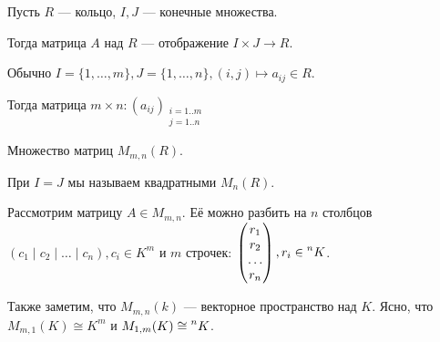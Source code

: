 \begin{definition}
    Пусть $R$ --- кольцо,  $I, J$ --- конечные множества.

    Тогда матрица $A$ над  $R$ --- отображение  $I \times J \to R$.

    Обычно  $I = \{1,\ldots, m\}, J = \{1, \ldots, n\}, (i, j) \mapsto a_{ij} \in R$.

    Тогда матрица $m \times n\!: (a_{ij})_{\substack{i=1..m \\ j = 1..n}}$
\end{definition}
\begin{definition}
    Множество матриц $M_{m, n}(R)$.

    При $I = J$ мы называем квадратными  $M_n(R)$.
\end{definition}

Рассмотрим матрицу $A \in M_{m, n}$. Её можно разбить на  $n$ столбцов  $(c_1 \mid c_2 \mid \ldots \mid c_n), c_i \in K^m$ и $m$ строчек:  $\begin{pmatrix} r_1 \\ r_2 \\ \ldots \\ r_n \end{pmatrix}, r_i \in \prescript{n}{}{K}$.

Также заметим, что $M_{m, n}(k)$ --- векторное пространство над  $K$. Ясно, что  $M_{m, 1}(K) \cong K^m$ и  $M_{1, m}(K) \cong \prescript{n}{}{K}$.

